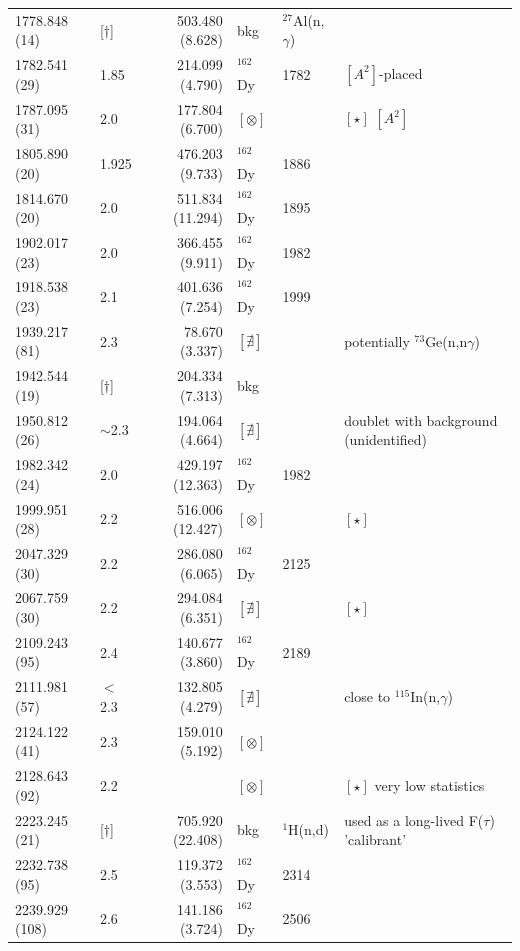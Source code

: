 \begin{landscape}
\begin{center}
\begin{longtable}{p{2.6cm}|p{1.2cm}|r|p{1.1cm}|p{2.0cm}|l}
  1778.848 (14)  & [$\dagger$]  &503.480  (8.628)& bkg & $^{27}$Al(n,$\gamma$) & \\
  1782.541 (29)  & 1.85       &214.099  (4.790)& $^{162}$Dy & 1782 &$[A^2]$-placed  \\
  1787.095 (31)  & 2.0        &177.804  (6.700)& $[\otimes]$ & & $[\star]$ $[A^2]$\\
  1805.890 (20)  & 1.925      &476.203  (9.733)& $^{162}$Dy & 1886 & \\
  1814.670 (20)  & 2.0        &511.834 (11.294)& $^{162}$Dy & 1895 & \\
  1902.017 (23)  & 2.0        &366.455  (9.911)& $^{162}$Dy & 1982 & \\
  1918.538 (23)  & 2.1        &401.636  (7.254)& $^{162}$Dy & 1999 & \\
  1939.217 (81)  & 2.3        & 78.670  (3.337)& $[\nexists]$ & & potentially $^{73}$Ge(n,n$\gamma$)\\
  1942.544 (19)  & [$\dagger$]  &204.334  (7.313)& bkg & & \\
  1950.812 (26)  & $\sim$2.3  &194.064  (4.664)& $[\nexists]$ & & doublet with background (unidentified)\\
  1982.342 (24)  & 2.0        &429.197 (12.363)& $^{162}$Dy & 1982 & \\
  1999.951 (28)  & 2.2        &516.006 (12.427)& $[\otimes]$ & & $[\star]$\\
  2047.329 (30)  & 2.2        &286.080  (6.065)& $^{162}$Dy & 2125 & \\
  2067.759 (30)  & 2.2        &294.084  (6.351)& $[\nexists]$ & &$[\star]$ \\
  2109.243 (95)  & 2.4        &140.677  (3.860)& $^{162}$Dy & 2189 & \\
  2111.981 (57)  & $<$2.3     &132.805  (4.279)& $[\nexists]$ & & close to $^{115}$In(n,$\gamma$) \\
  2124.122 (41)  & 2.3        &159.010  (5.192)& $[\otimes]$ & & \\
  2128.643 (92)  & 2.2        && $[\otimes]$ & & $[\star]$ very low statistics \\
  2223.245 (21)  & [$\dagger$]  &705.920 (22.408)& bkg & $^1$H(n,d) & used as a long-lived F($\tau$) 'calibrant'\\ %
  2232.738 (95)  & 2.5        &119.372  (3.553)& $^{162}$Dy & 2314 & \\   
  2239.929 (108) & 2.6        &141.186  (3.724)& $^{162}$Dy & 2506 & \\   

\end{longtable}
\end{center}
\end{landscape}
